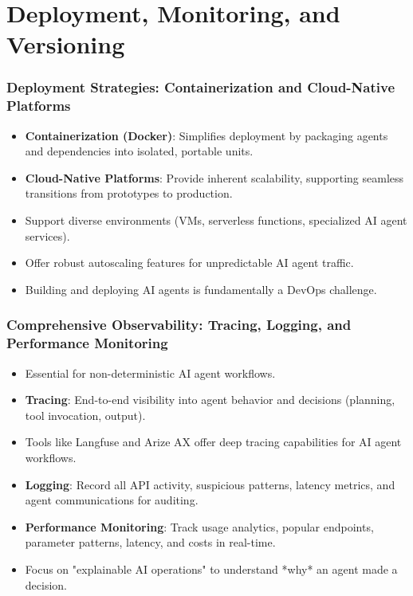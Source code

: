 \documentclass{beamer}       %
\begin{document}
\section{Deployment, Monitoring, and Versioning}

\begin{frame}
    \frametitle{Deployment Strategies: Containerization and Cloud-Native Platforms}
    \begin{itemize}
        \item \textbf{Containerization (Docker)}: Simplifies deployment by packaging agents and dependencies into isolated, portable units.
        \item \textbf{Cloud-Native Platforms}: Provide inherent scalability, supporting seamless transitions from prototypes to production.
        \item Support diverse environments (VMs, serverless functions, specialized AI agent services).
        \item Offer robust autoscaling features for unpredictable AI agent traffic.
        \item Building and deploying AI agents is fundamentally a DevOps challenge.
    \end{itemize}
\end{frame}

\begin{frame}
    \frametitle{Comprehensive Observability: Tracing, Logging, and Performance Monitoring}
    \begin{itemize}
        \item Essential for non-deterministic AI agent workflows.
        \item \textbf{Tracing}: End-to-end visibility into agent behavior and decisions (planning, tool invocation, output).
        \item Tools like Langfuse and Arize AX offer deep tracing capabilities for AI agent workflows.
        \item \textbf{Logging}: Record all API activity, suspicious patterns, latency metrics, and agent communications for auditing.
        \item \textbf{Performance Monitoring}: Track usage analytics, popular endpoints, parameter patterns, latency, and costs in real-time.
        \item Focus on "explainable AI operations" to understand *why* an agent made a decision.
    \end{itemize}
\end{frame}
\end{document}
